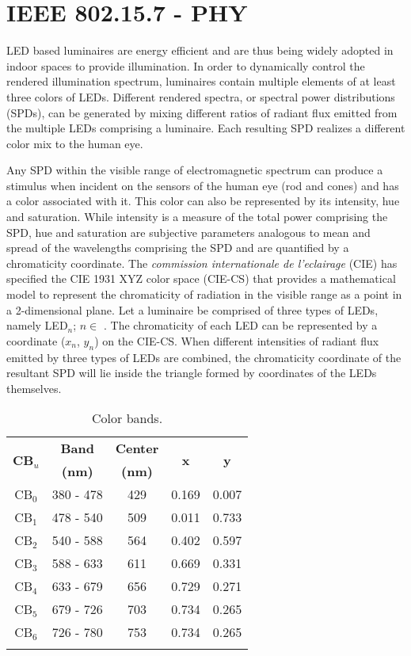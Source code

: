 \section{IEEE 802.15.7 - PHY}
\label{sec:ieeestd}
\graphicspath{{_MIMOColor/figures_csk/}}
LED based luminaires are energy efficient and are thus being widely adopted in indoor spaces to provide illumination. In order to dynamically control the rendered illumination spectrum, luminaires contain multiple elements of at least three colors of LEDs. Different rendered spectra, or spectral power distributions (SPDs), can be generated by mixing different ratios of radiant flux emitted from the multiple LEDs comprising a luminaire. Each resulting SPD realizes a different color mix to the human eye.

Any SPD within the visible range of electromagnetic spectrum can produce a stimulus when incident on the sensors of the human eye (rod and cones) and has a color associated with it. This color can also be represented by its intensity, hue and saturation. While intensity is a measure of the total power comprising the SPD, hue and saturation are subjective parameters analogous to mean and spread of the wavelengths comprising the SPD and are quantified by a chromaticity coordinate. The \textit{commission internationale de l'eclairage} (CIE) has specified the CIE 1931 XYZ color space (CIE-CS) that provides a mathematical model to represent the chromaticity of radiation in the visible range as a point in a 2-dimensional plane. Let a luminaire be comprised of three types of LEDs, namely LED$_{n}$; $n\in$ . The chromaticity of each LED can be represented by a coordinate ($x_{n}$, $y_{n}$) on the CIE-CS. When different intensities of radiant flux emitted by three types of LEDs are combined, the chromaticity coordinate of the resultant SPD will lie inside the triangle formed by coordinates of the LEDs themselves.

\renewcommand{\arraystretch}{1.1}
\begin{table}[t]
\centering
\begin{tabular}{|c|c|c|c|c|}
\hline
\multirow{2}{*}{\textbf{CB$_{u}$}} & \textbf{Band} & \textbf{Center} & \multirow{2}{*}{\textbf{x}} & \multirow{2}{*}{\textbf{y}}\\
 & \textbf{(nm)} & \textbf{(nm)} & & \\
\hline
CB$_{0}$ & 380 - 478 & 429 & 0.169 & 0.007\\
\hline
CB$_{1}$ & 478 - 540 & 509 & 0.011 & 0.733\\
\hline
CB$_{2}$ & 540 - 588 & 564 & 0.402 & 0.597\\
\hline
CB$_{3}$ & 588 - 633 & 611 & 0.669 & 0.331\\
\hline
CB$_{4}$ & 633 - 679 & 656 & 0.729 & 0.271\\
\hline
CB$_{5}$ & 679 - 726 & 703 & 0.734 & 0.265\\
\hline
CB$_{6}$ & 726 - 780 & 753 & 0.734 & 0.265\\
\hline
\multicolumn{5}{c}{ }
\end{tabular}
\caption{Color bands.}
\label{tCB}
\end{table}
\renewcommand{\arraystretch}{1.0}

